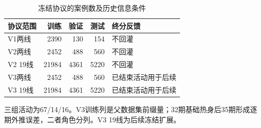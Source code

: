 \begin{table}[!htbp]\centering
\caption{冻结协议的案例数及历史信息条件}\label{tab:protocols}
\small\setlength{\tabcolsep}{4pt}\renewcommand{\arraystretch}{1.15}
\begin{tabularx}{\linewidth}{L r r r L}\toprule
协议范围 & 训练 & 验证 & 测试 & 终分反馈 \\
\midrule
V1两线 & 2390 & 130 & 154 & 不回灌 \\
V2两线 & 2452 & 488 & 560 & 不回灌 \\
V2 19线 & 21984 & 4361 & 5220 & 不回灌 \\
V3两线 & 2452 & 488 & 560 & 已结束活动用于后续 \\
V3 19线 & 21984 & 4361 & 5220 & 已结束活动用于后续 \\
\bottomrule\end{tabularx}
\par\vspace{4pt}\begin{minipage}{\linewidth}\footnotesize 三组活动为67/14/16。V3训练列是父数据集前缀量；32期基础热身后35期形成逐期外推误差，二者角色分列。V3 19线为后续冻结扩展。\end{minipage}
\end{table}
